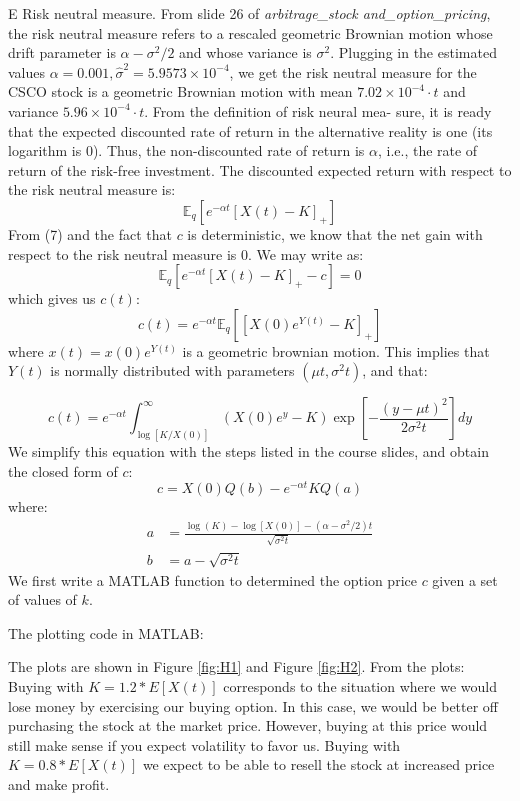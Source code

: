 \documentclass{cisXXX} %
\begin{document}
\HWproblem

E Risk neutral measure. From slide 26 of \textit{arbitrage\_stock and\_option\_pricing}, the risk neutral measure refers to a rescaled geometric Brownian motion whose drift parameter is $\alpha - \sigma ^ { 2 } / 2$ and whose variance is $\sigma^2$. Plugging in the estimated values $\alpha = 0.001, \hat { \sigma } ^ { 2 } = 5.9573 \times 10 ^ { - 4 }$, we get the risk neutral measure for the CSCO stock is a geometric Brownian motion with mean $7.02 \times 10 ^ { - 4 } \cdot t$ and variance $5.96 \times 10 ^ { - 4 } \cdot t$.
\HWproblem
From the definition of risk neural mea- sure, it is ready that the expected discounted rate of return in the alternative reality is one (its logarithm is 0). Thus, the non-discounted rate of return is $\alpha$, i.e., the rate of return of the risk-free investment.
\HWproblem
The discounted expected return with respect to the risk neutral measure is:
$$
\mathbb { E } _ { q } \left[ e ^ { - \alpha t } [ X ( t ) - K ] _ { + } \right]
$$
From (7) and the fact that $c$ is deterministic, we know that the net gain with respect to the risk neutral measure is $0$. We may write as:
$$
\mathbb { E } _ { q } \left[ e ^ { - \alpha t } [ X ( t ) - K ] _ { + } - c \right] = 0
$$
which gives us $c(t)$:
$$
c ( t ) = e ^ { - \alpha t } \mathbb { E } _ { q } \left[ \left[ X ( 0 ) e ^ { Y ( t ) } - K \right] _ { + } \right]
$$
where $x ( t ) = x ( 0 ) e ^ { Y ( t ) }$ is a geometric brownian motion. This implies that $Y ( t )$ is normally distributed with parameters $\left( \mu t , \sigma ^ { 2 } t \right)$, and that:

$$
c ( t ) = e ^ { - \alpha t } \int _ { \log [ K / X ( 0 ) ] } ^ { \infty } \left( X ( 0 ) e ^ { y } - K \right) \exp \left[ - \frac { ( y - \mu t ) ^ { 2 } } { 2 \sigma ^ { 2 } t } \right] d y
$$
We simplify this equation with the steps listed in the course slides, and obtain the closed form of $c$:
$$
c = X ( 0 ) Q ( b ) - e ^ { - \alpha t } K Q ( a )
$$
where:
$$
\begin{aligned} a & = \frac { \log ( K ) - \log [ X ( 0 ) ] - \left( \alpha - \sigma ^ { 2 } / 2 \right) t } { \sqrt { \sigma ^ { 2 } t } } \\ b & = a - \sqrt { \sigma ^ { 2 } t } \end{aligned}
$$
\HWproblem
We first write a MATLAB function to determined the option price $c$ given a set of values of $k$.

The plotting code in MATLAB:

The plots are shown in Figure \ref{fig:H1} and Figure \ref{fig:H2}.
From the plots:
Buying with $K = 1.2 * E [ X ( t ) ]$ corresponds to the situation where we would lose money by exercising our buying option. In this case, we would be better off purchasing the stock at the market price. However, buying at this price would still make sense if you expect volatility to favor us.
Buying with $K = 0.8 * E [ X ( t ) ]$ we expect to be able to resell the stock at increased price and make profit.
\end{document}
